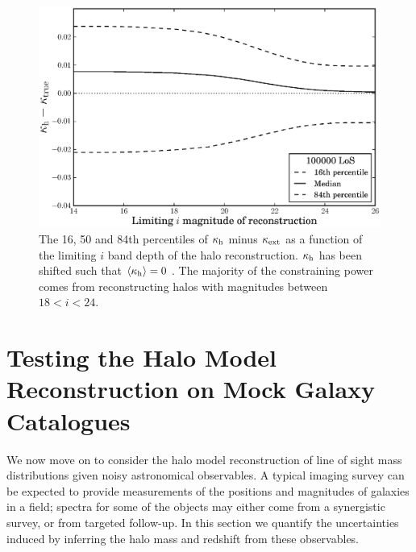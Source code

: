 \documentclass[useAMS,usenatbib,a4paper]{mn2e}
\begin{document}
\begin{figure}
\includegraphics[width=\columnwidth]{figs/mag_scatter.eps}
\caption[magcut]{The 16, 50 and 84th percentiles of $\kappa_{\rm h}$ minus
$\kappa_{\rm ext}$ as a function of the limiting $i$ band depth of the halo
reconstruction. $\kappa_{\rm h}$ has been shifted such that
$\left\langle\kappa_{\rm h}\right\rangle=0$ . The majority of the constraining power
comes from reconstructing halos with magnitudes between $18<i<24$.}
\label{fig:magcut}
\end{figure}



\section{Testing the Halo Model Reconstruction on Mock Galaxy Catalogues}
\label{sec:obsMstar+z}

We now move on to consider the halo model reconstruction of line of sight mass
distributions given noisy astronomical observables. A typical imaging survey
can be expected to provide measurements of the positions and magnitudes of
galaxies in a field;  spectra for some of the objects may either come from a
synergistic survey, or from targeted follow-up. In this section we quantify
the uncertainties induced by inferring the halo mass and redshift from these
observables. 

\end{document}
